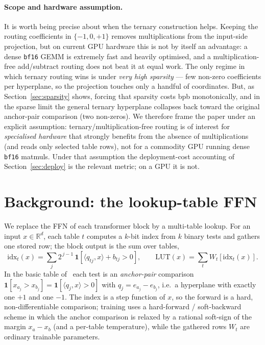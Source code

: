\documentclass[11pt]{article}
\begin{document}
\paragraph{Scope and hardware assumption.} It is worth being precise about when the ternary
construction helps. Keeping the routing coefficients in $\{-1,0,+1\}$ removes multiplications from
the input-side projection, but on current GPU hardware this is not by itself an advantage: a dense
\texttt{bf16} GEMM is extremely fast and heavily optimised, and a multiplication-free
add/subtract routing does not beat it at equal work. The only regime in which ternary routing wins
is under \emph{very high sparsity} --- few non-zero coefficients per hyperplane, so the projection
touches only a handful of coordinates. But, as Section~\ref{sec:sparsity} shows, forcing that
sparsity costs bpb monotonically, and in the sparse limit the general ternary hyperplane collapses
back toward the original anchor-pair comparison (two non-zeros). We therefore frame the paper under
an explicit assumption: ternary/multiplication-free routing is of interest for \emph{specialised
hardware} that strongly benefits from the absence of multiplications (and reads only selected
table rows), not for a commodity GPU running dense \texttt{bf16} matmuls. Under that assumption the
deployment-cost accounting of Section~\ref{sec:deploy} is the relevant metric; on a GPU it is not.

\section{Background: the lookup-table FFN}
\label{sec:basic}
We replace the FFN of each transformer block by a multi-table lookup. For an input
$x\in\mathbb{R}^{d}$, each table $t$ computes a $k$-bit index from $k$ binary tests and gathers one
stored row; the block output is the sum over tables,
\begin{equation}
\label{eq:lutfwd}
\mathrm{idx}_t(x)=\sum_{j} 2^{\,j-1}\,\mathbf{1}\!\left[\langle q_{tj},x\rangle+b_{tj}>0\right],
\qquad
\mathrm{LUT}(x)=\sum_t W_t\!\left[\mathrm{idx}_t(x)\right].
\end{equation}
In the basic table of~\cite{manifesto} each test is an \emph{anchor-pair} comparison
$\mathbf{1}[x_{a_j}>x_{b_j}]=\mathbf{1}[\langle q_j,x\rangle>0]$ with $q_j=e_{a_j}-e_{b_j}$, i.e.\ a
hyperplane with exactly one $+1$ and one $-1$. The index is a step function of $x$, so the forward
is a hard, non-differentiable comparison; training uses a hard-forward / soft-backward scheme in
which the anchor comparison is relaxed by a rational soft-sign of the margin $x_{a}-x_{b}$ (and a
per-table temperature), while the gathered rows $W_t$ are ordinary trainable parameters.
\end{document}
